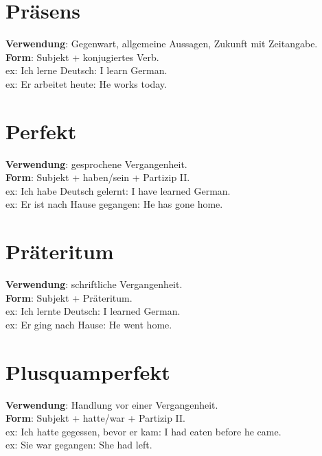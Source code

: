 \documentclass[a4paper]{article}
\title{}
\date{}
\begin{document}
    \maketitle
    
    
    \section{Präsens}
        \textbf{Verwendung}: Gegenwart, allgemeine Aussagen, Zukunft mit Zeitangabe.\\
        \textbf{Form}: Subjekt + konjugiertes Verb.\\
        ex: Ich lerne Deutsch: I learn German.\\
        ex: Er arbeitet heute: He works today.\\
    
    
    \section{Perfekt}
        \textbf{Verwendung}: gesprochene Vergangenheit.\\
        \textbf{Form}: Subjekt + haben/sein + Partizip II.\\
        ex: Ich habe Deutsch gelernt: I have learned German.\\
        ex: Er ist nach Hause gegangen: He has gone home.\\
    
    
    \section{Präteritum}
        \textbf{Verwendung}: schriftliche Vergangenheit.\\
        \textbf{Form}: Subjekt + Präteritum.\\
        ex: Ich lernte Deutsch: I learned German.\\
        ex: Er ging nach Hause: He went home.\\
    
    
    \section{Plusquamperfekt}
        \textbf{Verwendung}: Handlung vor einer Vergangenheit.\\
        \textbf{Form}: Subjekt + hatte/war + Partizip II.\\
        ex: Ich hatte gegessen, bevor er kam: I had eaten before he came.\\
        ex: Sie war gegangen: She had left.\\
    
\end{document}
